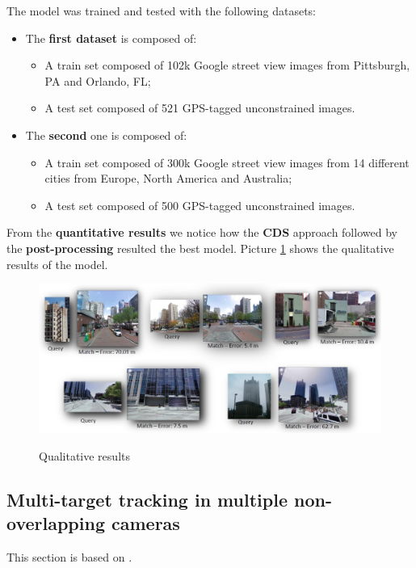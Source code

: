 The model was trained and tested with the following datasets:

\begin{itemize}
    \item The \textbf{first dataset} is composed of:
    \begin{itemize}
        \item A train set composed of 102k Google street view images from Pittsburgh, PA and Orlando, FL;
        \item A test set composed of 521 GPS-tagged unconstrained images.
    \end{itemize}
    \item The \textbf{second} one is composed of:
    \begin{itemize}
        \item A train set composed of 300k Google street view images from 14 different cities from Europe, North America and Australia;
        \item A test set composed of 500 GPS-tagged unconstrained images.
    \end{itemize}
\end{itemize}

From the \textbf{quantitative results} we notice how the \textbf{CDS} approach followed by the \textbf{post-processing} resulted the best model. Picture \ref{geo4} shows the qualitative results of the model.


\begin{figure}[h!]
    \centering
    \includegraphics[scale = 1.5]{img/geo4.jpg}
    \label{geo4}
    \caption{Qualitative results}
\end{figure}

\subsection{Multi-target tracking in multiple non-overlapping cameras}
This section is based on \cite{tesfaye2017multi}.

